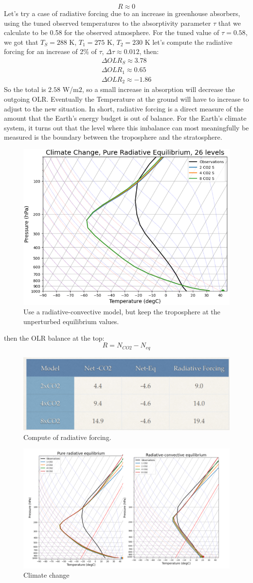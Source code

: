 $$R\approx0$$
Let’s try a case of radiative forcing due to an increase in greenhouse absorbers, using the tuned observed temperatures to the absorptivity parameter $\tau$ that we calculate to be 0.58 for the observed atmosphere. For the tuned value of $\tau=0.58$, we got that $T_S=288$ K, $T_1=275$ K, $T_2=230$ K let's compute the radiative forcing for an increase of 2\% of $\tau$, $\Delta \tau\approx 0.012$, then:
\begin{align*}
	\Delta OLR_S\approx 3.78 \\
	\Delta OLR_1\approx 0.65 \\
	\Delta OLR_2\approx-1.86
\end{align*}
So the total is $2.58$ W/m$2$, so a small increase in absorption will decrease the outgoing OLR. Eventually the Temperature at the ground will have to increase to adjust to the new situation. In short, radiative forcing is a direct measure of the amount that the Earth’s energy budget is out of balance. For the Earth’s climate system, it turns out that the level where this imbalance can most meaningfully be measured is the boundary between the troposphere and the stratosphere.

\begin{figure}[h!]
	\centering
	\includegraphics[width=0.5\linewidth]{uploads/Screenshot 2024-11-24 201309.png}
	\caption{Use a radiative-convective model, but keep the troposphere at the unperturbed equilibrium values.}
	\label{fig:enter-label}
\end{figure}
then the OLR balance at the top:
$$R=N_{CO2}-N_{eq}$$
\begin{figure}
	\centering
	\includegraphics[width=0.5\linewidth]{uploads/image11.png}
	\caption{Compute of radiative forcing.}
	\label{fig:enter-label}
\end{figure}
\begin{figure}[h!]
	\centering
	\includegraphics[width=0.5\linewidth]{uploads/Screenshot 2024-11-24 202614.png}
	\caption{Climate change}
	\label{fig:enter-label}
\end{figure}
